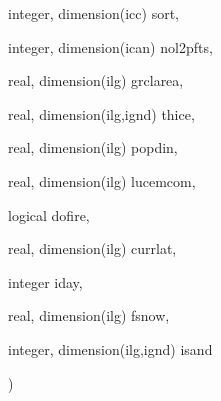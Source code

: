 {\begin{DoxyParamCaption}
\item[{integer, dimension(icc)}]{sort, }
\item[{integer, dimension(ican)}]{nol2pfts, }
\item[{real, dimension(ilg)}]{grclarea, }
\item[{real, dimension(ilg,ignd)}]{thice, }
\item[{real, dimension(ilg)}]{popdin, }
\item[{real, dimension(ilg)}]{lucemcom, }
\item[{logical}]{dofire, }
\item[{real, dimension(ilg)}]{currlat, }
\item[{integer}]{iday, }
\item[{real, dimension(ilg)}]{fsnow, }
\item[{integer, dimension(ilg,ignd)}]{isand}
\end{DoxyParamCaption}
)}\label{group__disturbance__scheme__disturb_ga0bed06e74bd06c387ae02bc545bf2a25}

